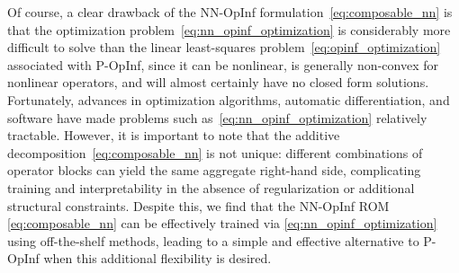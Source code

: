 \documentclass[3p,computermodern,11pt]{elsarticle}
\numberwithin{equation}{section}
\begin{document}
Of course, a clear drawback of the NN-OpInf formulation~\eqref{eq:composable_nn} is that the optimization problem~\eqref{eq:nn_opinf_optimization} is considerably more difficult to solve than the linear least-squares problem~\eqref{eq:opinf_optimization} associated with P-OpInf, since it can be nonlinear, is generally non-convex for nonlinear operators, and will almost certainly have no closed form solutions. %
Fortunately, advances in optimization algorithms, automatic differentiation, and software have made problems such as~\eqref{eq:nn_opinf_optimization} relatively tractable.
However, it is important to note that the additive decomposition~\eqref{eq:composable_nn} is not unique: different combinations of operator blocks can yield the same aggregate right-hand side,  complicating training and interpretability in the absence of regularization or additional structural constraints.  Despite this, we find that the NN-OpInf ROM \eqref{eq:composable_nn} can be effectively trained via \eqref{eq:nn_opinf_optimization} using off-the-shelf methods, leading to a simple and effective alternative to P-OpInf when this additional flexibility is desired.
\end{document}
